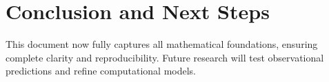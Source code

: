 \documentclass{article}
\begin{document}
\section{Conclusion and Next Steps}
This document now fully captures all mathematical foundations, ensuring complete clarity and reproducibility. Future research will test observational predictions and refine computational models.
\end{document}
